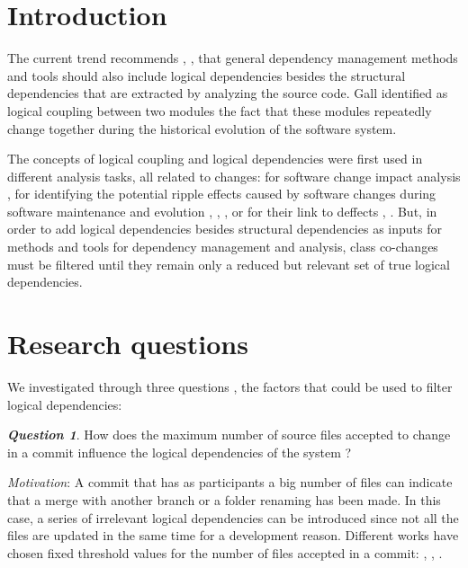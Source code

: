 \documentclass[conference]{IEEEtran}
\begin{document}



\section{Introduction}
\label{sec:intro}
The current trend recommends \cite{Oliva:2011:ISL:2067853.2068086}, \cite{DBLP:journals/jss/AjienkaC17}, \cite{Yu2007} that general dependency management methods and tools should also include logical dependencies besides the structural dependencies that are extracted by analyzing the source code. Gall \cite{Gall:1998:DLC:850947.853338} identified as logical coupling between two modules the fact that these modules repeatedly change together during the historical evolution of the software system.

The concepts of logical coupling and logical dependencies were first used in different analysis tasks, all related to changes: for software change impact analysis \cite{1553643}, for identifying the potential ripple effects caused by software changes during software maintenance and evolution \cite{DBLP:conf/issre/OlivaG15}, \cite{Oliva:2011:ISL:2067853.2068086}, \cite{Poshyvanyk2009}, \cite{posh2010} or for their link to deffects \cite{wiese}, \cite{Zimmermann:2004:MVH:998675.999460}. But, in order to add logical dependencies besides structural dependencies as inputs for methods and tools for dependency management and analysis, class co-changes must be filtered until they remain only a reduced but relevant set of true logical dependencies. 

\section{Research questions}
\label{sec:question}

We investigated through three questions \cite{mastersthesis}, \cite{SoftwareMining2018} the factors that could be used to filter logical dependencies:


\textit{\textbf{Question 1}}. How does the maximum number of source files accepted to change in a commit influence the logical dependencies of the system ? 

\textit{Motivation}: A commit that has as participants a big number of files can indicate that a merge with another branch or a folder renaming has been made. In this case, a series of irrelevant logical dependencies can be introduced since not all the files are updated in the same time for a development reason. Different works have chosen fixed threshold values for the number of files accepted in a commit: \cite{DBLP:journals/jss/AjienkaC17}, \cite{DBLP:journals/ese/AjienkaCC18}, \cite{Beck:2011:CMC:2025113.2025162}.
\end{document}
